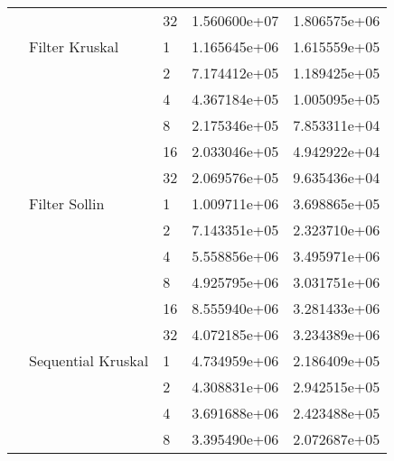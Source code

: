 \begin{tabular}{lllrr}
                                                       &                     & 32 &  1.560600e+07 &  1.806575e+06 \\
                                                       & Filter Kruskal & 1  &  1.165645e+06 &  1.615559e+05 \\
                                                       &                     & 2  &  7.174412e+05 &  1.189425e+05 \\
                                                       &                     & 4  &  4.367184e+05 &  1.005095e+05 \\
                                                       &                     & 8  &  2.175346e+05 &  7.853311e+04 \\
                                                       &                     & 16 &  2.033046e+05 &  4.942922e+04 \\
                                                       &                     & 32 &  2.069576e+05 &  9.635436e+04 \\
                                                       & Filter Sollin & 1  &  1.009711e+06 &  3.698865e+05 \\
                                                       &                     & 2  &  7.143351e+05 &  2.323710e+06 \\
                                                       &                     & 4  &  5.558856e+06 &  3.495971e+06 \\
                                                       &                     & 8  &  4.925795e+06 &  3.031751e+06 \\
                                                       &                     & 16 &  8.555940e+06 &  3.281433e+06 \\
                                                       &                     & 32 &  4.072185e+06 &  3.234389e+06 \\
                                                       & Sequential Kruskal & 1  &  4.734959e+06 &  2.186409e+05 \\
                                                       &                     & 2  &  4.308831e+06 &  2.942515e+05 \\
                                                       &                     & 4  &  3.691688e+06 &  2.423488e+05 \\
                                                       &                     & 8  &  3.395490e+06 &  2.072687e+05 \\

\end{tabular}
